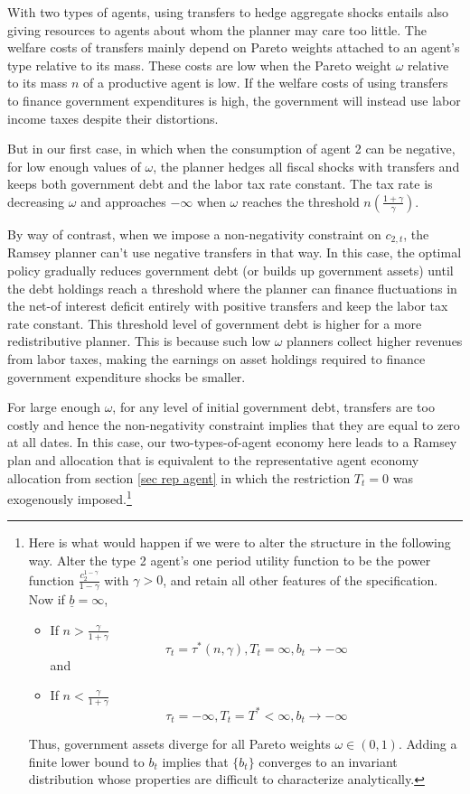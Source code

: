 \documentclass[thmsb,11pt]{article}
\begin{document}
With two types of  agents, using transfers to hedge aggregate shocks entails also giving resources to agents about whom  the planner may care too little.
 The welfare costs of transfers mainly depend on  Pareto weights attached to an agent's type relative to its mass.
                  These costs are low when the Pareto weight $\omega$ relative to its mass $n$ of a productive agent  is low.  If the welfare
                  costs of using transfers to finance government expenditures is high, the government will instead use labor income taxes
                  despite their distortions.


But in our  first case, in which when the consumption of agent 2 can be  negative, for low enough values of $\omega$, the planner hedges all
 fiscal shocks with transfers and keeps both government debt and the labor tax rate constant.
  The tax rate is decreasing $\omega$ and approaches $-\infty$ when $\omega$ reaches the threshold $n\left(\frac{1+\gamma}{\gamma}\right).$




By way of contrast, when we impose a non-negativity constraint on $c_{2,t}$, the Ramsey planner can't use negative transfers in that way.
In this case,
the optimal policy gradually reduces government debt (or builds up government assets) until the debt holdings reach a threshold where the planner can finance  fluctuations in the net-of interest deficit entirely with positive transfers and keep the labor tax rate constant. This threshold level of
government  debt is higher for a more  redistributive planner.   This is because such  low $\omega$ planners   collect higher revenues from labor taxes, making the earnings on asset holdings required  to finance government expenditure shocks be smaller.

For large enough $\omega$, for any level of initial government debt,  transfers are too costly  and hence the non-negativity constraint implies that they are equal to zero at all dates. In this case, our two-types-of-agent economy here leads to a Ramsey plan and allocation that is equivalent
to the representative agent economy allocation from section  \ref{sec rep agent}  in which the restriction $T_t= 0$ was exogenously 
imposed.\footnote{Here is what would happen if we were to alter the structure in the following way. Alter the type 2 agent's
one period utility function to be  the power function $\frac{c_2^{1-\gamma}}{1 - \gamma}$ with $\gamma > 0$, and retain all other
features of the specification. Now if $\underline{b}=\infty$, 
\begin{itemize}
\item If $n>\frac{\gamma}{1+\gamma}$
\[\tau_t=\tau^*(n,\gamma),T_t=\infty,b_t\to -\infty\]
and
\item If $n<\frac{\gamma}{1+\gamma}$
\[\tau_t=-\infty,T_t=T^*<\infty,b_t\to -\infty\]
\end{itemize}
Thus, government assets diverge for all  Pareto weights $\omega \in (0,1)$. Adding a finite lower bound to $b_t$ implies that $\{b_t\}$ converges to an invariant distribution whose properties are difficult  to characterize analytically.}
\end{document}
